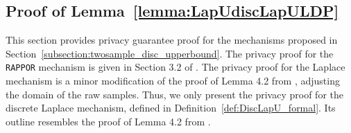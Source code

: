 \documentclass[twoside,11pt]{article}
\begin{document}
\begin{appendix}
	\section{Proof of Lemma~\ref{lemma:LapUdiscLapULDP}}
	\label{proof:LapUdiscLapULDP}
	This section provides privacy guarantee proof for the mechanisms proposed in Section~\ref{subsection:twosample_disc_upperbound}. The privacy proof for the \texttt{RAPPOR} mechanism is given in Section 3.2 of \citet{duchi2013local}. The privacy proof for the Laplace mechanism is a minor modification of the proof of Lemma 4.2 from \citet{Lam-Weil2021MinimaxConstraint}, adjusting the domain of the raw samples. Thus, we only present the privacy proof for the discrete Laplace mechanism, defined in Definition~\ref{def:DiscLapU_formal}.
	Its outline  resembles the proof of Lemma 4.2 from \citet{Lam-Weil2021MinimaxConstraint}.
	

\end{appendix}
\end{document}
